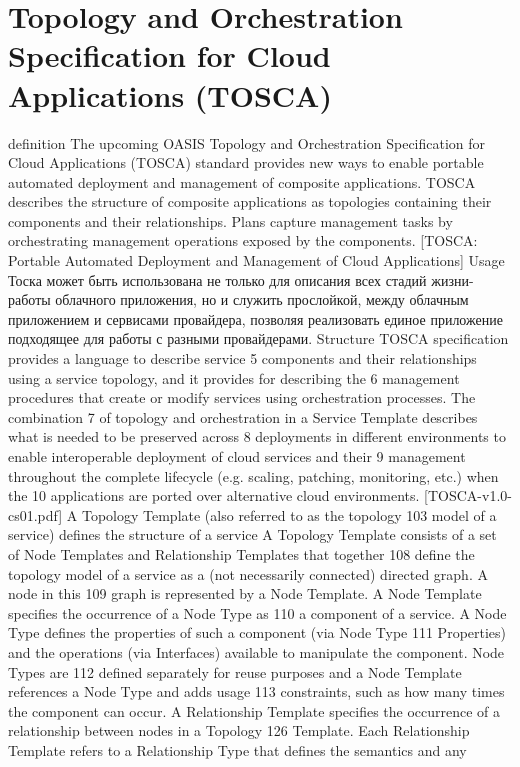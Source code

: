 \section{Topology and Orchestration Specification for Cloud	Applications (TOSCA)} \label{sec:tosca}
definition
The upcoming OASIS Topology and Orchestration Specification for
Cloud Applications (TOSCA) standard provides new ways to enable portable automated
deployment and management of composite applications. TOSCA describes the
structure of composite applications as topologies containing their components and
their relationships. Plans capture management tasks by orchestrating management
operations exposed by the components.
[TOSCA: Portable Automated Deployment and Management of Cloud Applications]
Usage
Тоска может быть использована не только для описания всех стадий жизни- работы облачного приложения, но и служить прослойкой, между облачным приложением и сервисами провайдера, позволяя реализовать единое приложение подходящее для работы с разными провайдерами. 
\fi 
Structure
TOSCA specification provides a language to describe service
5 components and their relationships using a service topology, and it provides for describing the
6 management procedures that create or modify services using orchestration processes. The combination
7 of topology and orchestration in a Service Template describes what is needed to be preserved across
8 deployments in different environments to enable interoperable deployment of cloud services and their
9 management throughout the complete lifecycle (e.g. scaling, patching, monitoring, etc.) when the
10 applications are ported over alternative cloud environments.
[TOSCA-v1.0-cs01.pdf]
 A Topology Template (also referred to as the topology
103 model of a service) defines the structure of a service
A Topology Template consists of a set of Node Templates and Relationship Templates that together
108 define the topology model of a service as a (not necessarily connected) directed graph. A node in this
109 graph is represented by a Node Template. A Node Template specifies the occurrence of a Node Type as
110 a component of a service. A Node Type defines the properties of such a component (via Node Type
111 Properties) and the operations (via Interfaces) available to manipulate the component. Node Types are
112 defined separately for reuse purposes and a Node Template references a Node Type and adds usage
113 constraints, such as how many times the component can occur.
A Relationship Template specifies the occurrence of a relationship between nodes in a Topology
126 Template. Each Relationship Template refers to a Relationship Type that defines the semantics and any
